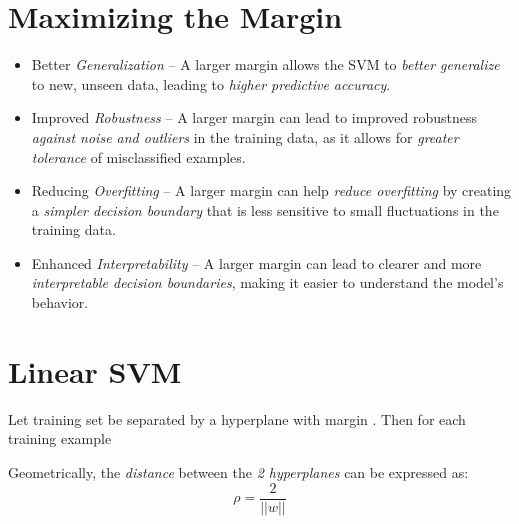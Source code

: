 \documentclass[
	number={2},
	title={Learning Linear Separators{,} SVMs and Kernels}
]{cs584notes}
\begin{document}
\section{Maximizing the Margin}\label{sec:maximizing-the-margin}
\begin{itemize}
	\item Better \emph{Generalization} -- A larger margin allows the SVM to \emph{better generalize} to new, unseen data, leading to \emph{higher predictive accuracy}.
	\item Improved \emph{Robustness} -- A larger margin can lead to improved robustness \emph{against noise and outliers} in the training data, as it allows for \emph{greater tolerance} of misclassified examples.
	\item Reducing \emph{Overfitting} -- A larger margin can help \emph{reduce overfitting} by creating a \emph{simpler decision boundary} that is less sensitive to small fluctuations in the training data.
	\item Enhanced \emph{Interpretability} -- A larger margin can lead to clearer and more \emph{interpretable decision boundaries}, making it easier to understand the model's behavior.
\end{itemize}

\section{Linear SVM}\label{sec:linear-svm}
Let training set  be separated by a hyperplane with margin \data{$\rho$}.
Then for each training example 


Geometrically, the \emph{distance} between the \emph{2 hyperplanes} can be expressed as:
\begin{equation}
	\rho = \frac{2}{||w||}
	\label{eq:hyperplane-distance}
\end{equation}
\end{document}
